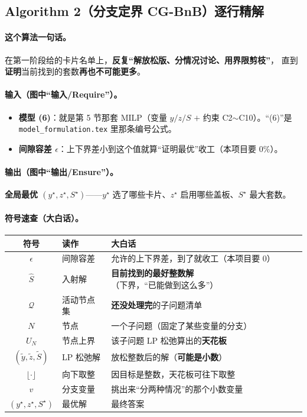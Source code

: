 \documentclass[11pt]{ctexart}
\newcommand{\code}[1]{\texttt{#1}}
\begin{document}
\subsection{Algorithm 2（分支定界 CG-BnB）逐行精解}
\paragraph{这个算法一句话。}在第一阶段给的卡片名单上，\textbf{反复“解放松版、分情况讨论、用界限剪枝”}，
直到\textbf{证明}当前找到的套数\textbf{再也不可能更多}。

\paragraph{输入（图中“输入/Require”）。}
\begin{itemize}[leftmargin=1.8em,itemsep=1pt]
  \item \textbf{模型 (6)}：就是第 5 节那套 MILP（变量 $y/z/S$ $+$ 约束 C2$\sim$C10）。“(6)”是 \code{model\_formulation.tex} 里那条编号公式。
  \item \textbf{间隙容差 $\epsilon$}：上下界差小到这个值就算“证明最优”收工（本项目要 $0\%$）。
\end{itemize}
\paragraph{输出（图中“输出/Ensure”）。}\textbf{全局最优 $(y^\star,z^\star,S^\star)$}——$y^\star$ 选了哪些卡片、$z^\star$ 启用哪些盖板、$S^\star$ 最大套数。

\paragraph{符号速查（大白话）。}
\begin{center}\small
\begin{longtable}{@{}c l l@{}}
\toprule 符号 & 读作 & 大白话 \\ \midrule\endhead
$\epsilon$ & 间隙容差 & 允许的上下界差，到了就收工（本项目要 $0$） \\
$\hat S$ & 入射解 & \textbf{目前找到的最好整数解}（下界，“已能做到这么多”） \\
$\mathcal{Q}$ & 活动节点集 & \textbf{还没处理完}的子问题清单 \\
$N$ & 节点 & 一个子问题（固定了某些变量的分支） \\
$U_N$ & 节点上界 & 该子问题 LP 松弛算出的\textbf{天花板} \\
$(\tilde y,\tilde z,\tilde S)$ & LP 松弛解 & 放松整数后的解（\textbf{可能是小数}） \\
$\lfloor\cdot\rfloor$ & 向下取整 & 因目标是整数，天花板可往下取整 \\
$v$ & 分支变量 & 挑出来“分两种情况”的那个小数变量 \\
$(y^\star,z^\star,S^\star)$ & 最优解 & 最终答案 \\
\bottomrule
\end{longtable}
\end{center}
\end{document}
